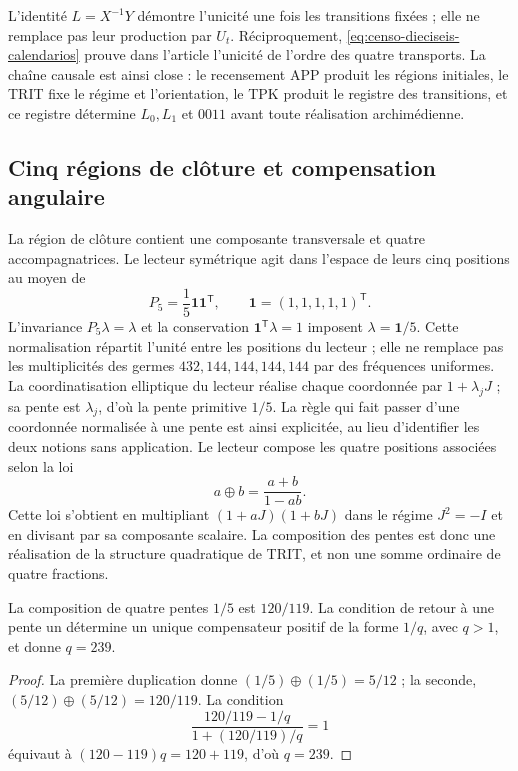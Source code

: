 L'identité \(L=X^{-1}Y\) démontre l'unicité une fois les
transitions fixées ; elle ne remplace pas leur production par \(U_t\). Réciproquement,
\eqref{eq:censo-dieciseis-calendarios} prouve dans l'article l'unicité
de l'ordre des quatre transports. La chaîne causale est ainsi close :
le recensement APP produit les régions initiales, le TRIT fixe le régime et
l'orientation, le TPK produit le registre des transitions, et ce registre
détermine \(L_0,L_1\) et \(0011\) avant toute réalisation archimédienne.

\subsection{Cinq régions de clôture et compensation angulaire}

La région de clôture contient une composante transversale et quatre accompagnatrices. Le lecteur symétrique agit dans l'espace de leurs cinq positions au moyen de
\[
 P_5=\frac15\mathbf1\mathbf1^{\mathsf T},\qquad
 \mathbf1=(1,1,1,1,1)^{\mathsf T}.
\]
L'invariance \(P_5\lambda=\lambda\) et la conservation \(\mathbf1^{\mathsf T}\lambda=1\) imposent \(\lambda=\mathbf1/5\). Cette normalisation répartit l'unité entre les positions du lecteur ; elle ne remplace pas les multiplicités des germes \(432,144,144,144,144\) par des fréquences uniformes. La coordinatisation elliptique du lecteur réalise chaque coordonnée par \(1+\lambda_jJ\) ; sa pente est \(\lambda_j\), d'où la pente primitive \(1/5\). La règle qui fait passer d'une coordonnée normalisée à une pente est ainsi explicitée, au lieu d'identifier les deux notions sans application. Le lecteur compose les quatre positions associées selon la loi
\begin{equation}
 a\oplus b=\frac{a+b}{1-ab}.
 \label{eq:suma-pendientes}
\end{equation}
Cette loi s'obtient en multipliant \((1+aJ)(1+bJ)\) dans le régime \(J^2=-I\) et en divisant par sa composante scalaire. La composition des pentes est donc une réalisation de la structure quadratique de TRIT, et non une somme ordinaire de quatre fractions.

\begin{proposition}
La composition de quatre pentes \(1/5\) est \(120/119\). La condition de retour à une pente un détermine un unique compensateur positif de la forme \(1/q\), avec \(q>1\), et donne \(q=239\).
\end{proposition}
\begin{proof}
La première duplication donne \((1/5)\oplus(1/5)=5/12\) ; la seconde, \((5/12)\oplus(5/12)=120/119\). La condition
\[
 \frac{120/119-1/q}{1+(120/119)/q}=1
\]
équivaut à \((120-119)q=120+119\), d'où \(q=239\).
\end{proof}

